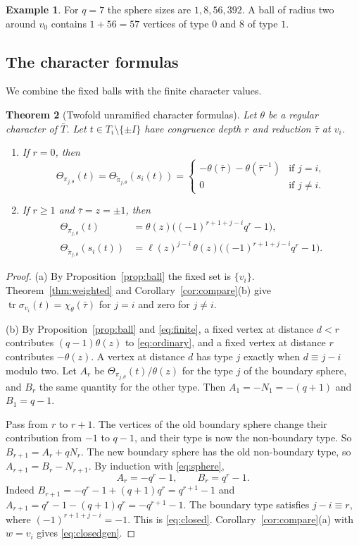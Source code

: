 \documentclass[12pt,letterpaper]{article}
\numberwithin{equation}{section}
\newtheorem{theorem}{Theorem}[section]
\theoremstyle{definition}
\newtheorem{example}[theorem]{Example}
\theoremstyle{remark}
\newcommand{\tr}{\operatorname{tr}}
\begin{document}
\begin{example}
For $q=7$ the sphere sizes are $1,8,56,392$. A ball of radius two around $v_0$ contains $1+56=57$ vertices of type $0$ and $8$ of type $1$.
\end{example}

\subsection{The character formulas}
We combine the fixed balls with the finite character values.

\begin{theorem}[Twofold unramified character formulas]\label{thm:depthzero}
Let $\theta$ be a regular character of $\bar T$. Let $t\in T_i\setminus\{\pm I\}$ have congruence depth $r$ and reduction $\bar\tau$ at $v_i$.
\begin{enumerate}[label=(\alph*),leftmargin=2.2em]
\item If $r=0$, then
\[
 \Theta_{\pi_{j,\theta}}(t)=\Theta_{\widetilde\pi_{j,\theta}}(s_i(t))=
 \begin{cases}
 -\theta(\bar\tau)-\theta(\bar\tau^{-1})&\text{if } j=i,\\
 0&\text{if } j\ne i.
 \end{cases}
\]
\item If $r\ge1$ and $\bar\tau=z=\pm1$, then
\begin{align}
 \Theta_{\pi_{j,\theta}}(t)&=\theta(z)
 \bigl((-1)^{r+1+j-i}q^r-1\bigr),\label{eq:closed}\\
 \Theta_{\widetilde\pi_{j,\theta}}(s_i(t))
 &=\ell(z)^{j-i}\,\theta(z)
 \bigl((-1)^{r+1+j-i}q^r-1\bigr).\label{eq:closedgen}
\end{align}
\end{enumerate}
\end{theorem}
\begin{proof}
(a) By Proposition~\ref{prop:ball} the fixed set is $\{v_i\}$. Theorem~\ref{thm:weighted} and Corollary~\ref{cor:compare}(b) give $\tr\sigma_{v_i}(t)=\chi_\theta(\bar\tau)$ for $j=i$ and zero for $j\ne i$.

(b) By Proposition~\ref{prop:ball} and \eqref{eq:finite}, a fixed vertex at distance $d<r$ contributes $(q-1)\theta(z)$ to \eqref{eq:ordinary}, and a fixed vertex at distance $r$ contributes $-\theta(z)$. A vertex at distance $d$ has type $j$ exactly when $d\equiv j-i$ modulo two. Let $A_r$ be $\Theta_{\pi_{j,\theta}}(t)/\theta(z)$ for the type $j$ of the boundary sphere, and $B_r$ the same quantity for the other type. Then $A_1=-N_1=-(q+1)$ and $B_1=q-1$.

Pass from $r$ to $r+1$. The vertices of the old boundary sphere change their contribution from $-1$ to $q-1$, and their type is now the non-boundary type. So $B_{r+1}=A_r+qN_r$. The new boundary sphere has the old non-boundary type, so $A_{r+1}=B_r-N_{r+1}$. By induction with \eqref{eq:sphere},
\[
 A_r=-q^r-1,\qquad B_r=q^r-1 .
\]
Indeed $B_{r+1}=-q^r-1+(q+1)q^r=q^{r+1}-1$ and $A_{r+1}=q^r-1-(q+1)q^r=-q^{r+1}-1$. The boundary type satisfies $j-i\equiv r$, where $(-1)^{r+1+j-i}=-1$. This is \eqref{eq:closed}. Corollary~\ref{cor:compare}(a) with $w=v_i$ gives \eqref{eq:closedgen}.
\end{proof}
\end{document}
